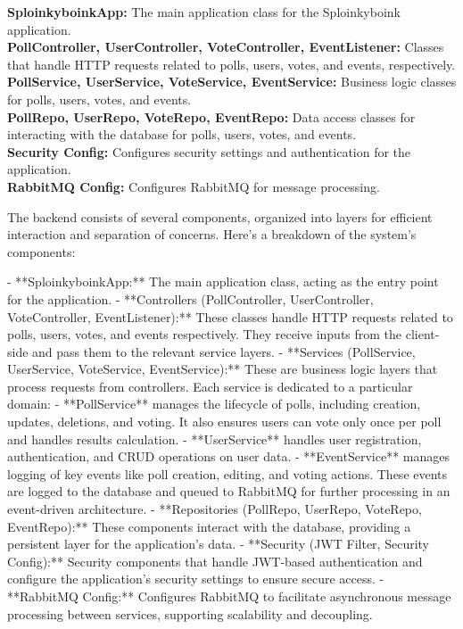 \noindent
\textbf{SploinkyboinkApp:} The main application class for the Sploinkyboink application.\\
\textbf{PollController, UserController, VoteController, EventListener:} Classes that handle HTTP requests related to polls, users, votes, and events, respectively.\\
\textbf{PollService, UserService, VoteService, EventService:} Business logic classes for polls, users, votes, and events.\\
\textbf{PollRepo, UserRepo, VoteRepo, EventRepo:} Data access classes for interacting with the database for polls, users, votes, and events.\\
\textbf{Security Config:} Configures security settings and authentication for the application.\\
\textbf{RabbitMQ Config:} Configures RabbitMQ for message processing.


The backend consists of several components, organized into layers for efficient interaction and separation of concerns. Here's a breakdown of the system’s components:

- **SploinkyboinkApp:** The main application class, acting as the entry point for the application.
- **Controllers (PollController, UserController, VoteController, EventListener):** These classes handle HTTP requests related to polls, users, votes, and events respectively. They receive inputs from the client-side and pass them to the relevant service layers.
- **Services (PollService, UserService, VoteService, EventService):** These are business logic layers that process requests from controllers. Each service is dedicated to a particular domain:
  - **PollService** manages the lifecycle of polls, including creation, updates, deletions, and voting. It also ensures users can vote only once per poll and handles results calculation.
  - **UserService** handles user registration, authentication, and CRUD operations on user data.
  - **EventService** manages logging of key events like poll creation, editing, and voting actions. These events are logged to the database and queued to RabbitMQ for further processing in an event-driven architecture.
- **Repositories (PollRepo, UserRepo, VoteRepo, EventRepo):** These components interact with the database, providing a persistent layer for the application’s data.
- **Security (JWT Filter, Security Config):** Security components that handle JWT-based authentication and configure the application’s security settings to ensure secure access.
- **RabbitMQ Config:** Configures RabbitMQ to facilitate asynchronous message processing between services, supporting scalability and decoupling.

